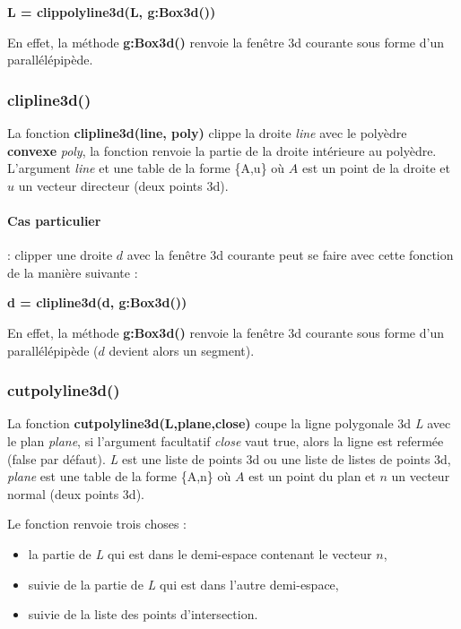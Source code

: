 \begin{center}
\textbf{L = clippolyline3d(L, g:Box3d())}
\end{center}

En effet, la méthode \textbf{g:Box3d()} renvoie la fenêtre 3d courante sous forme d'un parallélépipède.


\subsubsection{clipline3d()}
La fonction \textbf{clipline3d(line, poly)} clippe la droite \emph{line} avec le polyèdre \textbf{convexe} \emph{poly}, la fonction renvoie la partie de la droite intérieure au polyèdre. L'argument \emph{line} et une table de la forme \{A,u\} où $A$ est un point de la droite et $u$ un vecteur directeur (deux points 3d).

\paragraph{Cas particulier} : clipper une droite $d$ avec la fenêtre 3d courante peut se faire avec cette fonction de la manière suivante :

\begin{center}
\textbf{d = clipline3d(d, g:Box3d())}
\end{center}

En effet, la méthode \textbf{g:Box3d()} renvoie la fenêtre 3d courante sous forme d'un parallélépipède ($d$ devient alors un segment).

\subsubsection{cutpolyline3d()}
La fonction \textbf{cutpolyline3d(L,plane,close)} coupe la ligne polygonale 3d \emph{L} avec le plan \emph{plane}, si l'argument facultatif \emph{close} vaut true, alors la ligne est refermée (false par défaut).
\emph{L} est une liste de points 3d ou une liste de listes de points 3d, \emph{plane} est une table de la forme \{A,n\} où $A$ est un point du plan et $n$ un vecteur normal (deux points 3d).

Le fonction renvoie trois choses :
\begin{itemize}
    \item la partie de \emph{L} qui est dans le demi-espace contenant le vecteur $n$,
    \item suivie de la partie de \emph{L} qui est dans l'autre demi-espace,
    \item suivie de la liste des points d'intersection.
\end{itemize}

